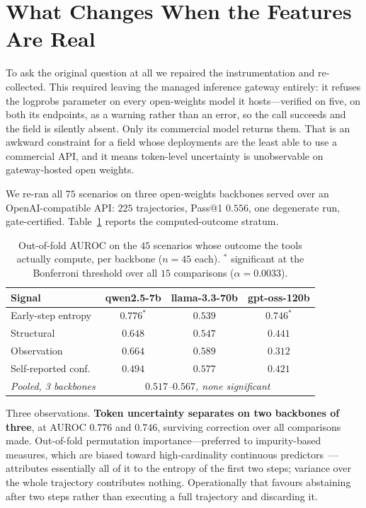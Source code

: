 \documentclass[conference]{IEEEtran}
\begin{document}
\section{What Changes When the Features Are Real}

To ask the original question at all we repaired the instrumentation and
re-collected. This required leaving the managed inference gateway entirely: it
refuses the logprobs parameter on every open-weights model it hosts---verified
on five, on both its endpoints, as a warning rather than an error, so the call
succeeds and the field is silently absent. Only its commercial model returns
them. That is an awkward constraint for a field whose deployments are the least
able to use a commercial API, and it means token-level uncertainty is
unobservable on gateway-hosted open weights.

We re-ran all $75$ scenarios on three open-weights backbones served over an
OpenAI-compatible API: $225$ trajectories, Pass@1 $0.556$, one degenerate run,
gate-certified. Table~\ref{tab:res} reports the computed-outcome stratum.

\begin{table}[t]
\centering
\caption{Out-of-fold AUROC on the $45$ scenarios whose outcome the tools
actually compute, per backbone ($n=45$ each). $^{\ast}$ significant at the
Bonferroni threshold over all $15$ comparisons ($\alpha=0.0033$).}
\label{tab:res}
\footnotesize
\begin{tabular}{lccc}
\toprule
\textbf{Signal} & \textbf{qwen2.5-7b} & \textbf{llama-3.3-70b} & \textbf{gpt-oss-120b} \\
\midrule
Early-step entropy & $\mathbf{0.776}^{\ast}$ & $0.539$ & $\mathbf{0.746}^{\ast}$ \\
Structural         & $0.648$ & $0.547$ & $0.441$ \\
Observation        & $0.664$ & $0.589$ & $0.312$ \\
Self-reported conf.& $0.494$ & $0.577$ & $0.421$ \\
\midrule
\textit{Pooled, 3 backbones} & \multicolumn{3}{c}{\textit{$0.517$--$0.567$, none significant}} \\
\bottomrule
\end{tabular}
\end{table}

Three observations. \textbf{Token uncertainty separates on two backbones of
three}, at AUROC $0.776$ and $0.746$, surviving correction over all comparisons
made. Out-of-fold permutation importance---preferred to impurity-based measures,
which are biased toward high-cardinality continuous
predictors~\cite{strobl}---attributes essentially all of it to the entropy of
the first two steps; variance over the whole trajectory contributes nothing.
Operationally that favours abstaining after two steps rather than executing a
full trajectory and discarding it.
\end{document}
